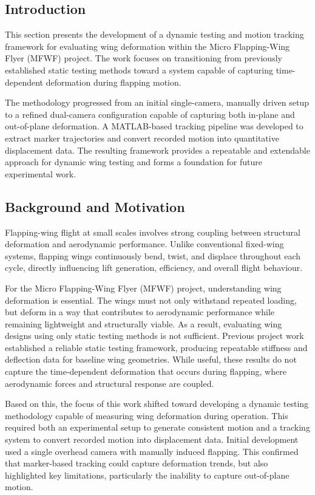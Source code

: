  \subsection{Introduction}
 This section presents the development of a dynamic testing and motion tracking framework for evaluating wing deformation within the Micro Flapping-Wing Flyer (MFWF) project. The work focuses on transitioning from previously established static testing methods toward a system capable of capturing time-dependent deformation during flapping motion.
 
The methodology progressed from an initial single-camera, manually driven setup to a refined dual-camera configuration capable of capturing both in-plane and out-of-plane deformation. A MATLAB-based tracking pipeline was developed to extract marker trajectories and convert recorded motion into quantitative displacement data. The resulting framework provides a repeatable and extendable approach for dynamic wing testing and forms a foundation for future experimental work.
 
\subsection{Background and Motivation}
 
Flapping-wing flight at small scales involves strong coupling between structural deformation and aerodynamic performance. Unlike conventional fixed-wing systems, flapping wings continuously bend, twist, and displace throughout each cycle, directly influencing lift generation, efficiency, and overall flight behaviour.
 
For the Micro Flapping-Wing Flyer (MFWF) project, understanding wing deformation is essential. The wings must not only withstand repeated loading, but deform in a way that contributes to aerodynamic performance while remaining lightweight and structurally viable. As a result, evaluating wing designs using only static testing methods is not sufficient. Previous project work established a reliable static testing framework, producing repeatable stiffness and deflection data for baseline wing geometries. While useful, these results do not capture the time-dependent deformation that occurs during flapping, where aerodynamic forces and structural response are coupled.
 
Based on this, the focus of this work shifted toward developing a dynamic testing methodology capable of measuring wing deformation during operation. This required both an experimental setup to generate consistent motion and a tracking system to convert recorded motion into displacement data. Initial development used a single overhead camera with manually induced flapping. This confirmed that marker-based tracking could capture deformation trends, but also highlighted key limitations, particularly the inability to capture out-of-plane motion.
 
